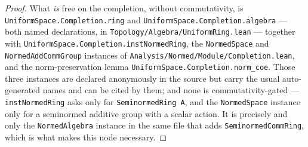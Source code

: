 \begin{proof}
    What \emph{is} free on the completion, without commutativity, is \texttt{UniformSpace.Completion.ring} and \texttt{UniformSpace.Completion.algebra} --- both named declarations, in \texttt{Topology/Algebra/UniformRing.lean} --- together with \texttt{UniformSpace.Completion.instNormedRing}, the \texttt{NormedSpace} and \texttt{NormedAddCommGroup} instances of \texttt{Analysis/Normed/Module/Completion.lean}, and the norm-preservation lemma \texttt{UniformSpace.Completion.norm\_coe}. Those three instances are declared anonymously in the source but carry the usual auto-generated names and can be cited by them; and none is commutativity-gated --- \texttt{instNormedRing} asks only for \texttt{SeminormedRing A}, and the \texttt{NormedSpace} instance only for a seminormed additive group with a scalar action. It is precisely and only the \texttt{NormedAlgebra} instance in the same file that adds \texttt{SeminormedCommRing}, which is what makes this node necessary.
\end{proof}

